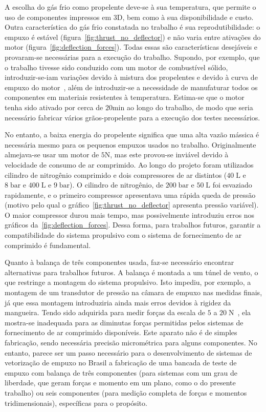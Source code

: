 A escolha do gás frio como propelente deve-se à sua temperatura, que permite o uso de componentes impressos em 3D, bem como à sua disponibilidade e custo. Outra característica do gás frio constatada no trabalho é sua reprodutibilidade: o empuxo é estável (figura~\ref{fig:thrust_no_deflector}) e não varia entre ativações do motor (figura~\ref{fig:deflection_forces}). Todas essas são características desejáveis e provaram-se necessárias para a execução do trabalho. Supondo, por exemplo, que o trabalho tivesse sido conduzido com um motor de combustível sólido, introduzir-se-iam variações devido à mistura dos propelentes e devido à curva de empuxo do motor~\cite{Sutton}, além de introduzir-se a necessidade de manufaturar todos os componentes em materiais resistentes à temperatura. Estima-se que o motor tenha sido ativado por cerca de \(20\mathrm{min}\) ao longo do trabalho, de modo que seria necessário fabricar vários grãos-propelente para a execução dos testes necessários.

No entanto, a baixa energia do propelente significa que uma alta vazão mássica é necessária mesmo para os pequenos empuxos usados no trabalho. Originalmente almejava-se usar um motor de \(5\mathrm{N}\), mas este provou-se inviável devido à velocidade de consumo de ar comprimido. Ao longo do projeto foram utilizados cilindro de nitrogênio comprimido e dois compressores de ar distintos (\(40\;\mathrm{L}\) e \(8\;\mathrm{bar}\) e \(400\;\mathrm{L}\) e \(9\;\mathrm{bar}\)). O cilindro de nitrogênio, de \(200\;\mathrm{bar}\) e \(50\;\mathrm{L}\) foi esvaziado rapidamente, e o primeiro compressor apresentava uma rápida queda de pressão (motivo pelo qual o gráfico~\ref{fig:thrust_no_deflector} apresenta pressão variável). O maior compressor durou mais tempo, mas possivelmente introduziu erros nos gráficos da~\ref{fig:deflection_forces}. Dessa forma, para trabalhos futuros, garantir a compatibilidade do sistema propulsivo com o sistema de fornecimento de ar comprimido é fundamental.\ 

Quanto à balança de três componentes usada, faz-se necessário encontrar alternativas para trabalhos futuros. A balança é montada a um túnel de vento, o que restringe a montagem do sistema propulsivo. Isto impediu, por exemplo, a montagem de um transdutor de pressão na câmara de empuxo nas medidas finais, já que essa montagem introduziria ainda mais erros devidos à rigidez da mangueira. Tendo sido adquirida para medir forças da escala de \(5\) a \(20\;\mathrm{N}\)~\cite{lab}, ela mostra-se inadequada para as diminutas forças permitidas pelos sistemas de fornecimento de ar comprimido disponíveis. Este aparato não é de simples fabricação, sendo necessária precisão micrométrica para alguns componentes. No entanto, parece ser um passo necessário para o desenvolvimento de sistemas de vetorização de empuxo no Brasil a fabricação de uma bancada de teste de empuxo com balança de três componentes (para sistemas com um grau de liberdade, que geram forças e momento em um plano, como o do presente trabalho) ou seis componentes (para medição completa de forças e momentos tridimensionais), específicas para o propósito.


